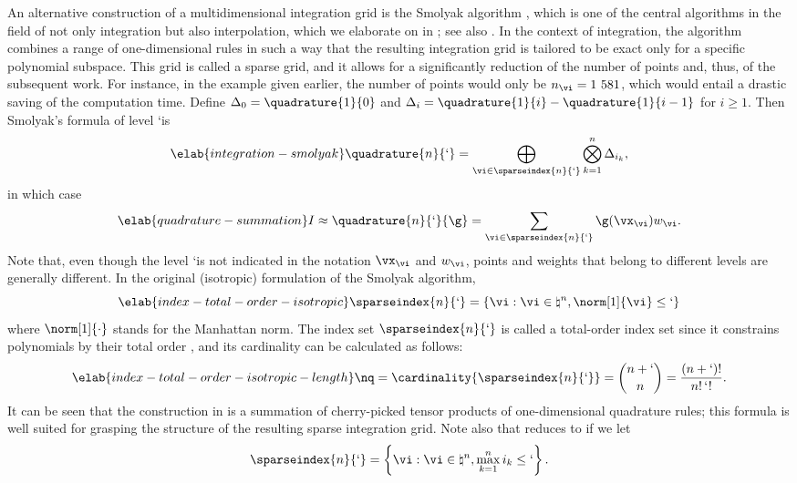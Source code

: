 An alternative construction of a multidimensional integration grid is the
Smolyak algorithm \cite{smolyak1963}, which is one of the central algorithms in
the field of not only integration but also interpolation, which we elaborate on
in ; see also \cite{eldred2008, heiss2008,
maitre2010}. In the context of integration, the algorithm combines a range of
one-dimensional rules in such a way that the resulting integration grid is
tailored to be exact only for a specific polynomial subspace. This grid is
called a sparse grid, and it allows for a significantly reduction of the number
of points and, thus, of the subsequent work. For instance, in the example given
earlier, the number of points would only be $n_{\vi} = 1~581$, which would
entail a drastic saving of the computation time. Define $\Delta_0 =
\quadrature{1}{0}$ and $\Delta_i = \quadrature{1}{i} - \quadrature{1}{i - 1}$
for $i \geq 1$. Then Smolyak's formula of level \lq is
\begin{equation} \elab{integration-smolyak}
  \quadrature{n}{\lq} = \bigoplus_{\vi \in \sparseindex{n}{\lq}} \bigotimes_{k = 1}^n \Delta_{i_k},
\end{equation}
in which case
\begin{equation} \elab{quadrature-summation}
  I \approx \quadrature{n}{\lq}{\g} = \sum_{\vi \in \sparseindex{n}{\lq}} \g(\vx_{\vi}) w_{\vi}.
\end{equation}
Note that, even though the level \lq is not indicated in the notation
$\vx_{\vi}$ and $w_{\vi}$, points and weights that belong to different levels
are generally different. In the original (isotropic) formulation of the Smolyak
algorithm,
\begin{equation} \elab{index-total-order-isotropic}
  \sparseindex{n}{\lq} = \left\{ \vi: \vi \in \natural^n, \norm[1]{\vi} \leq \lq \right\}
\end{equation}
where $\norm[1]{\cdot}$ stands for the Manhattan norm. The index set
$\sparseindex{n}{\lq}$ is called a total-order index set since it constrains
polynomials by their total order \cite{eldred2008, beck2011}, and its
cardinality can be calculated as follows:
\begin{equation} \elab{index-total-order-isotropic-length}
  \nq = \cardinality{\sparseindex{n}{\lq}} = {n + \lq \choose n} = \frac{(n + \lq)!}{n! \, \lq!}.
\end{equation}
It can be seen that the construction in  is a
summation of cherry-picked tensor products of one-dimensional quadrature rules;
this formula is well suited for grasping the structure of the resulting sparse
integration grid. Note also that  reduces to
 if we let
\[
  \sparseindex{n}{\lq} = \left\{ \vi: \vi \in \natural^n, \max_{k = 1}^n i_k \leq \lq \right\}.
\]

